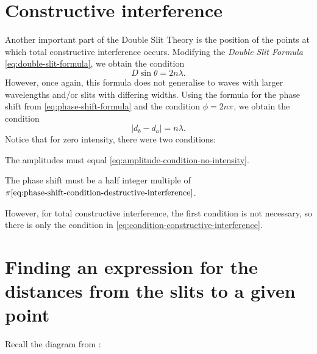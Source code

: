 \documentclass{paper}
\begin{document}
\section{Constructive interference}
Another important part of the Double Slit Theory is the position of the
points at which total constructive interference occurs. Modifying the 
\textit{Double Slit Formula} \eqref{eq:double-slit-formula}, we obtain
the condition 
\begin{equation}
    D\sin{\theta} = 2n\lambda.
\end{equation}
However, once again, this formula does not generalise to waves with larger wavelengths
and/or slits with differing widths. Using the formula for the phase shift from \eqref{eq:phase-shift-formula}
and the condition $\phi = 2n\pi$, we obtain the condition
\begin{equation}
    \label{eq:condition-constructive-interference}
    \lvert{}d_{b} - d_{a}\rvert = n\lambda.
\end{equation}
Notice that for zero intensity, there were two conditions:
\begin{boldenumerate}
    \item The amplitudes must equal \eqref{eq:amplitude-condition-no-intensity}.
    \item The phase shift must be a half integer multiple of $\pi \eqref{eq:phase-shift-condition-destructive-interference}$.
\end{boldenumerate}
However, for total constructive interference, the first condition is not necessary,
so there is only the condition in \eqref{eq:condition-constructive-interference}.
\section{Finding an expression for the distances from the slits to a given point}
\label{section:distance-formulas}
Recall the diagram from :
\end{document}

